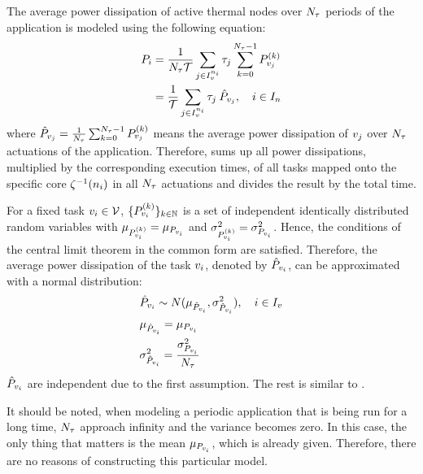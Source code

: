 The average power dissipation of active thermal nodes over $N_{\tau}$ periods of the application is modeled using the following equation:
\begin{align}
  \power_i & = \frac{1}{\periodcount \period} \sum_{j \in \taskindex^{\node_i}} \executiontime_j \sum_{k = 0}^{\periodcount - 1} \power^{(k)}_{\task_j} \nonumber \\
  & = \frac{1}{\period} \sum_{j \in \taskindex^{\node_i}} \executiontime_j \: \a{\power}_{\task_j}, \sep i \in \nodeindex \equlabel{node-average-power}
\end{align}
where $\hat{P}_{v_j} = \frac{1}{N_{\tau}} \sum_{k = 0}^{N_{\tau} - 1} P^{(k)}_{v_j}$ means the average power dissipation of $v_j$ over $N_{\tau}$ actuations of the application. Therefore,  sums up all power dissipations, multiplied by the corresponding execution times, of all tasks mapped onto the specific core $\zeta^{-1}(n_i)$ in all $N_{\tau}$ actuations and divides the result by the total time.

For a fixed task $v_i \in \mathcal{V}$, $\{ P^{(k)}_{v_i} \}_{k \in \mathbb{N}}$ is a set of independent identically distributed random variables with $\mu_{P^{(k)}_{v_i}} = \mu_{P_{v_i}}$ and $\sigma_{P^{(k)}_{v_i}}^2 = \sigma_{P_{v_i}}^2$. Hence, the conditions of the central limit theorem in the common form are satisfied. Therefore, the average power dissipation of the task $v_i$, denoted by $\hat{P}_{v_i}$, can be approximated with a normal distribution:
\begin{align*}
  & \hat{P}_{v_i} \sim N(\mu_{\hat{P}_{v_i}}, \sigma_{\hat{P}_{v_i}}^2), \hspace{10pt} i \in I_v \\
  & \mu_{\hat{P}_{v_i}} = \mu_{P_{v_i}} \\
  & \sigma_{\hat{P}_{v_i}}^2 = \frac{\sigma_{P_{v_i}}^2}{N_{\tau}}
\end{align*}
$\hat{P}_{v_i}$ are independent due to the first assumption. The rest is similar to .

It should be noted, when modeling a periodic application that is being run for a long time, $N_{\tau}$ approach infinity and the variance becomes zero. In this case, the only thing that matters is the mean $\mu_{P_{v_i}}$, which is already given. Therefore, there are no reasons of constructing this particular model.
